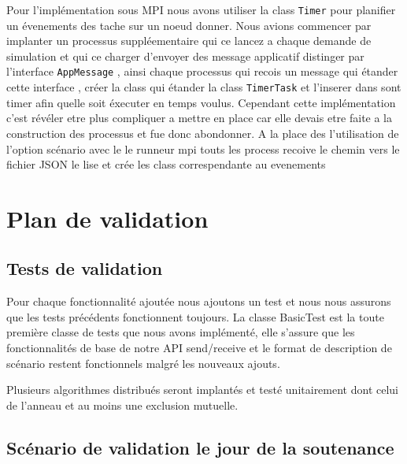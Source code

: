\documentclass{article}
\begin{document}
				\vspace{5mm}
				Pour l'implémentation sous MPI nous avons utiliser la class \verb|Timer| pour planifier un évenements des tache sur un noeud donner.
				\newline
				Nous avions commencer par implanter un processus suppléementaire qui ce lancez a chaque demande de simulation et qui ce charger d'envoyer des 
				message applicatif distinger par l'interface \verb|AppMessage| , ainsi chaque processus qui recois un message qui étander cette interface , créer la class 
				qui étander la class \verb|TimerTask| et l'inserer dans sont timer afin quelle soit éxecuter en temps voulus.
				\newline
				Cependant cette implémentation c'est révéler etre plus compliquer a mettre en place car elle devais etre faite a la construction des processus et fue donc abondonner.
				\newline
				A la place des l'utilisation de l'option scénario avec le le runneur mpi touts les process recoive le chemin vers le fichier JSON le lise et crée les class correspendante
				au evenements 
		
				
		
		\section{Plan de validation}
			\subsection{Tests de validation}
			Pour chaque fonctionnalité ajoutée nous ajoutons un test et nous nous assurons que les tests précédents fonctionnent toujours.
			\newline
			La classe BasicTest est la toute première classe de tests que nous avons implémenté, elle s'assure que les fonctionnalités de base de notre API
			send/receive et le format de description de scénario restent fonctionnels malgré les nouveaux ajouts.

			Plusieurs algorithmes distribués seront implantés et testé unitairement dont celui de l'anneau et au moins une exclusion mutuelle.
		
			\subsection{Scénario de validation le jour de la soutenance}
		
\end{document}
